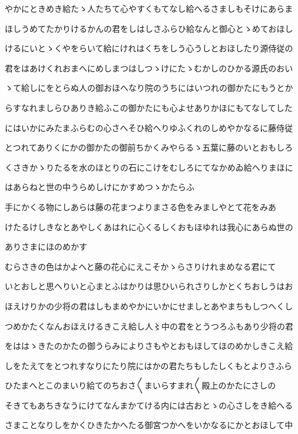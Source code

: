 \documentclass[a4paper,11pt,landscape]{ltjtarticle}
\begin{document}
やかにときめき給たゝ人たちて心やすくもてなし給へるさましもそけにあらま
\par\medskip
ほしうめてたかりけるかんの君をしはしさふらひ給なんと御心とゝめておほし
\par\medskip
けるにいとゝくやをらいて給にけれはくちをしう心うしとおほしたり源侍従の
\par\medskip
君をはあけくれおまへにめしまつはしつゝけにたゝむかしのひかる源氏のおい
\par\medskip
ゝて給しにをとらぬ人の御おほへなり院のうちにはいつれの御かたにもうとか
\par\medskip
らすなれましらひありき給ふこの御かたにも心よせありかほにもてなしてした
\par\medskip
にはいかにみたまふらむの心さへそひ給へりゆふくれのしめやかなるに藤侍従
\par\medskip
とつれてありくにかの御かたの御前ちかくみやらるゝ五葉に藤のいとおもしろ
\par\medskip
くさきかゝりたるを水のほとりの石にこけをむしろにてなかめゐ給へりまほに
\par\medskip
はあらねと世の中うらめしけにかすめつゝかたらふ
\par\medskip
手にかくる物にしあらは藤の花まつよりまさる色をみましやとて花をみあ
\par\medskip
けたるけしきなとあやしくあはれに心くるしくおもほゆれは我心にあらぬ世の
\par\medskip
ありさまにほのめかす
\par\medskip
むらさきの色はかよへと藤の花心にえこそかゝらさりけれまめなる君にて
\par\medskip
いとおしと思へりいと心まとふはかりは思ひいられさりしかとくちおしうはお
\par\medskip
ほえけりかの少将の君はしもまめやかにいかにせましとあやまちもしつへくし
\par\medskip
つめかたくなんおほえけるきこえ給し人〻中の君をとうつろふもあり少将の君
\par\medskip
をははゝきたのかたの御うらみによりさもやとおもほしてほのめかしきこえ給
\par\medskip
しをたえてをとつれすなりにたり院にはかの君たちもしたしくもとよりさふら
\par\medskip
ひたまへとこのまいり給てのちおさ〱まいらすまれ〱殿上のかたにさしの
\par\medskip
そきてもあちきなうにけてなんまかてける内には古おとゝの心さしをき給へる
\par\medskip
さまことなりしをかくひきたかへたる御宮つかへをいかなるにかとおほして中
\par\medskip
\end{document}
